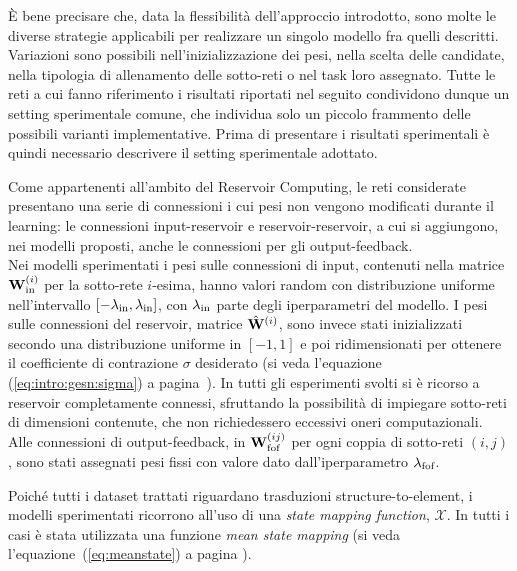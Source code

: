\`E bene precisare che, data la flessibilità dell'approccio introdotto, sono molte le diverse strategie applicabili per realizzare un singolo modello fra quelli descritti. Variazioni sono possibili nell'inizializzazione dei pesi, nella scelta delle candidate, nella tipologia di allenamento delle sotto-reti o nel task loro assegnato. Tutte le reti a cui fanno riferimento i risultati riportati nel seguito condividono dunque un setting sperimentale comune, che individua solo un piccolo frammento delle possibili varianti implementative. Prima di presentare i risultati sperimentali è quindi necessario descrivere il setting sperimentale adottato.

Come appartenenti all'ambito del Reservoir Computing, le reti considerate presentano una serie di connessioni i cui pesi non vengono modificati durante il learning: le connessioni input-reservoir e reservoir-reservoir, a cui si aggiungono, nei modelli proposti, anche le connessioni per gli output-feedback. \\
Nei modelli sperimentati i pesi sulle connessioni di input, contenuti nella matrice $\matr{W}_\textup{in}^{(i)}$ per la sotto-rete $i$-esima, hanno valori random con distribuzione uniforme nell'intervallo $[-\lambda_\textup{in}, \lambda_\textup{in}]$, con $\lambda_\textup{in}$ parte degli iperparametri del modello. I pesi sulle connessioni del reservoir, matrice $\hat{\matr{W}}^{(i)}$, sono invece stati inizializzati secondo una distribuzione uniforme in $[-1,1]$ e poi ridimensionati per ottenere il coefficiente di contrazione $\sigma$ desiderato (si veda l'equazione (\ref{eq:intro:gesn:sigma}) a pagina~\pageref{eq:intro:gesn:sigma}). In tutti gli esperimenti svolti si è ricorso a reservoir completamente connessi, sfruttando la possibilità di impiegare sotto-reti di dimensioni contenute, che non richiedessero eccessivi oneri computazionali.\\
Alle connessioni di output-feedback, in $\matr{W}_\textup{fof}^{(ij)}$ per ogni coppia di sotto-reti $(i,j)$, sono stati assegnati pesi fissi con valore dato dall'iperparametro $\lambda_\textup{fof}$.

Poiché tutti i dataset trattati riguardano trasduzioni structure-to-element, i modelli sperimentati ricorrono all'uso di una \textit{state mapping function}, $\mathcal{X}$. In tutti i casi è stata utilizzata una funzione \emph{mean state mapping} (si veda l'equazione~(\ref{eq:meanstate}) a pagina \pageref{eq:meanstate}).


